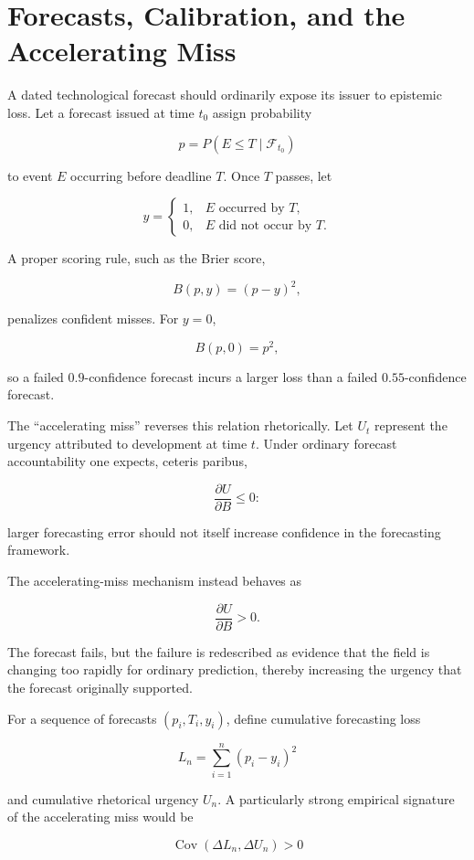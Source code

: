 \documentclass[11pt]{article}
\begin{document}
\section{Forecasts, Calibration, and the Accelerating Miss}

A dated technological forecast should ordinarily expose its issuer to
epistemic loss. Let a forecast issued at time \(t_0\) assign probability

\[
p=P(E\leq T\mid\mathcal F_{t_0})
\]

to event \(E\) occurring before deadline \(T\). Once \(T\) passes, let

\[
y=
\begin{cases}
1,&E\text{ occurred by }T,\\
0,&E\text{ did not occur by }T.
\end{cases}
\]

A proper scoring rule, such as the Brier score,

\[
B(p,y)=(p-y)^2,
\]

penalizes confident misses. For \(y=0\),

\[
B(p,0)=p^2,
\]

so a failed \(0.9\)-confidence forecast incurs a larger loss than a failed
\(0.55\)-confidence forecast.

The ``accelerating miss'' reverses this relation rhetorically. Let \(U_t\)
represent the urgency attributed to development at time \(t\). Under ordinary
forecast accountability one expects, ceteris paribus,

\[
\frac{\partial U}{\partial B}\leq 0:
\]

larger forecasting error should not itself increase confidence in the
forecasting framework.

The accelerating-miss mechanism instead behaves as

\[
\frac{\partial U}{\partial B}>0.
\]

The forecast fails, but the failure is redescribed as evidence that the field
is changing too rapidly for ordinary prediction, thereby increasing the
urgency that the forecast originally supported.

For a sequence of forecasts \((p_i,T_i,y_i)\), define cumulative forecasting
loss

\[
L_n
=
\sum_{i=1}^{n}
(p_i-y_i)^2
\]

and cumulative rhetorical urgency \(U_n\). A particularly strong empirical
signature of the accelerating miss would be

\[
\operatorname{Cov}(\Delta L_n,\Delta U_n)>0
\]
\end{document}
